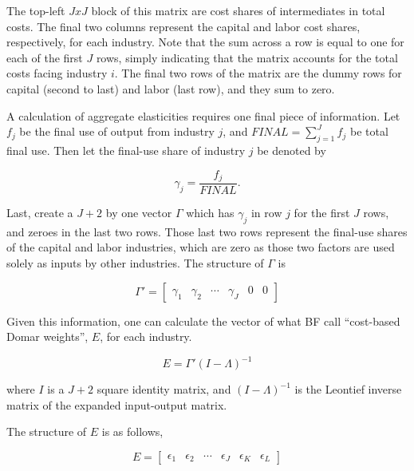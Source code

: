 \documentclass[11pt]{article}
\begin{document}
The top-left $JxJ$ block of this matrix are cost shares of intermediates in total costs. The final two columns represent the capital and labor cost shares, respectively, for each industry. Note that the sum across a row is equal to one for each of the first $J$ rows, simply indicating that the matrix accounts for the total costs facing industry $i$. The final two rows of the matrix are the dummy rows for capital (second to last) and labor (last row), and they sum to zero.

A calculation of aggregate elasticities requires one final piece of information. Let $f_j$ be the final use of output from industry $j$, and $FINAL = \sum_{j=1}^J f_j$ be total final use. Then let the final-use share of industry $j$ be denoted by

\begin{equation}
	\gamma_j = \frac{f_j}{FINAL}.
\end{equation}

Last, create a $J+2$ by one vector $\Gamma$ which has $\gamma_j$ in row $j$ for the first $J$ rows, and zeroes in the last two rows. Those last two rows represent the final-use shares of the capital and labor industries, which are zero as those two factors are used solely as inputs by other industries. The structure of $\Gamma$ is

\begin{equation}
	\Gamma' = 
	\begin{bmatrix}
		\gamma_1 &
		\gamma_2 &
		\cdots &
		\gamma_J &
		0 &
		0
	\end{bmatrix} \label{EQ_Gamma}
\end{equation}

Given this information, one can calculate the vector of what BF call ``cost-based Domar weights'', $E$, for each industry. 

\begin{equation}
	E = \Gamma' (I - \Lambda)^{-1} \label{EQ_E}
\end{equation}

where $I$ is a $J+2$ square identity matrix, and $(I - \Lambda)^{-1}$ is the Leontief inverse matrix of the expanded input-output matrix. 

The structure of $E$ is as follows,

\begin{equation}
	E = 
	\begin{bmatrix}
		\epsilon_1 &
		\epsilon_2 &
		\cdots &
		\epsilon_J &
		\epsilon_K &
		\epsilon_L
	\end{bmatrix}
\end{equation}
\end{document}
